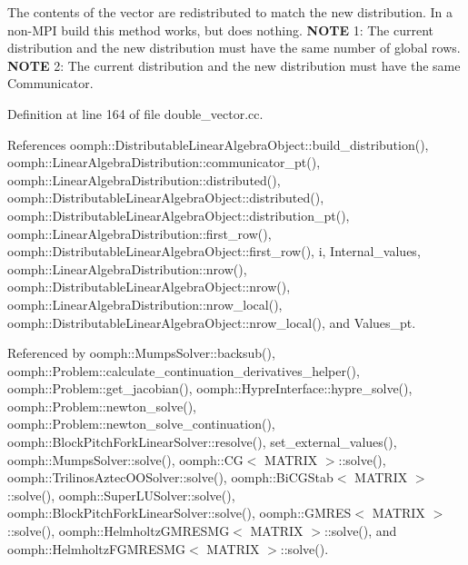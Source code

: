 The contents of the vector are redistributed to match the new distribution. In a non-\/\+M\+PI build this method works, but does nothing. {\bfseries N\+O\+TE} 1\+: The current distribution and the new distribution must have the same number of global rows. {\bfseries N\+O\+TE} 2\+: The current distribution and the new distribution must have the same Communicator. 

Definition at line 164 of file double\+\_\+vector.\+cc.



References oomph\+::\+Distributable\+Linear\+Algebra\+Object\+::build\+\_\+distribution(), oomph\+::\+Linear\+Algebra\+Distribution\+::communicator\+\_\+pt(), oomph\+::\+Linear\+Algebra\+Distribution\+::distributed(), oomph\+::\+Distributable\+Linear\+Algebra\+Object\+::distributed(), oomph\+::\+Distributable\+Linear\+Algebra\+Object\+::distribution\+\_\+pt(), oomph\+::\+Linear\+Algebra\+Distribution\+::first\+\_\+row(), oomph\+::\+Distributable\+Linear\+Algebra\+Object\+::first\+\_\+row(), i, Internal\+\_\+values, oomph\+::\+Linear\+Algebra\+Distribution\+::nrow(), oomph\+::\+Distributable\+Linear\+Algebra\+Object\+::nrow(), oomph\+::\+Linear\+Algebra\+Distribution\+::nrow\+\_\+local(), oomph\+::\+Distributable\+Linear\+Algebra\+Object\+::nrow\+\_\+local(), and Values\+\_\+pt.



Referenced by oomph\+::\+Mumps\+Solver\+::backsub(), oomph\+::\+Problem\+::calculate\+\_\+continuation\+\_\+derivatives\+\_\+helper(), oomph\+::\+Problem\+::get\+\_\+jacobian(), oomph\+::\+Hypre\+Interface\+::hypre\+\_\+solve(), oomph\+::\+Problem\+::newton\+\_\+solve(), oomph\+::\+Problem\+::newton\+\_\+solve\+\_\+continuation(), oomph\+::\+Block\+Pitch\+Fork\+Linear\+Solver\+::resolve(), set\+\_\+external\+\_\+values(), oomph\+::\+Mumps\+Solver\+::solve(), oomph\+::\+C\+G$<$ M\+A\+T\+R\+I\+X $>$\+::solve(), oomph\+::\+Trilinos\+Aztec\+O\+O\+Solver\+::solve(), oomph\+::\+Bi\+C\+G\+Stab$<$ M\+A\+T\+R\+I\+X $>$\+::solve(), oomph\+::\+Super\+L\+U\+Solver\+::solve(), oomph\+::\+Block\+Pitch\+Fork\+Linear\+Solver\+::solve(), oomph\+::\+G\+M\+R\+E\+S$<$ M\+A\+T\+R\+I\+X $>$\+::solve(), oomph\+::\+Helmholtz\+G\+M\+R\+E\+S\+M\+G$<$ M\+A\+T\+R\+I\+X $>$\+::solve(), and oomph\+::\+Helmholtz\+F\+G\+M\+R\+E\+S\+M\+G$<$ M\+A\+T\+R\+I\+X $>$\+::solve().

\mbox{\label{classoomph_1_1DoubleVector_a4715c8cf47f9fc56d95889343d1a3b82}} 
